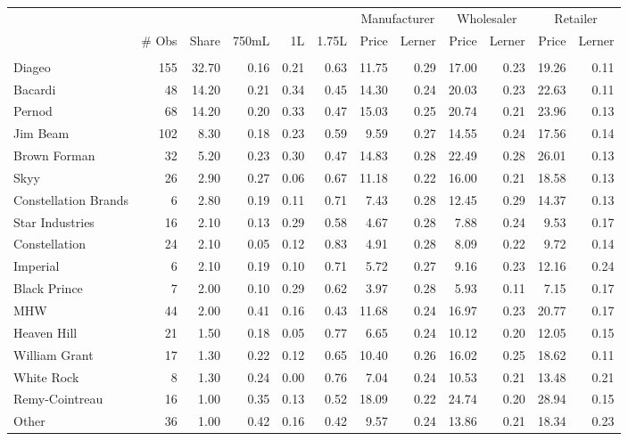 \begin{tabular}{lrrrrrrrrrrr}
\toprule
 & & & & & &  \multicolumn{2}{c}{ Manufacturer } & \multicolumn{2}{c}{ Wholesaler }& \multicolumn{2}{c}{ Retailer } \\ 
 & \# Obs & Share & 750mL & 1L & 1.75L & Price & Lerner & Price & Lerner & Price & Lerner \\
 &  &  &  &  &  &  &  &  &  &  &  \\
\midrule
Diageo & 155 & 32.70 & 0.16 & 0.21 & 0.63 & 11.75 & 0.29 & 17.00 & 0.23 & 19.26 & 0.11 \\
Bacardi & 48 & 14.20 & 0.21 & 0.34 & 0.45 & 14.30 & 0.24 & 20.03 & 0.23 & 22.63 & 0.11 \\
Pernod & 68 & 14.20 & 0.20 & 0.33 & 0.47 & 15.03 & 0.25 & 20.74 & 0.21 & 23.96 & 0.13 \\
Jim Beam & 102 & 8.30 & 0.18 & 0.23 & 0.59 & 9.59 & 0.27 & 14.55 & 0.24 & 17.56 & 0.14 \\
Brown Forman & 32 & 5.20 & 0.23 & 0.30 & 0.47 & 14.83 & 0.28 & 22.49 & 0.28 & 26.01 & 0.13 \\
Skyy & 26 & 2.90 & 0.27 & 0.06 & 0.67 & 11.18 & 0.22 & 16.00 & 0.21 & 18.58 & 0.13 \\
Constellation Brands & 6 & 2.80 & 0.19 & 0.11 & 0.71 & 7.43 & 0.28 & 12.45 & 0.29 & 14.37 & 0.13 \\
Star Industries & 16 & 2.10 & 0.13 & 0.29 & 0.58 & 4.67 & 0.28 & 7.88 & 0.24 & 9.53 & 0.17 \\
Constellation & 24 & 2.10 & 0.05 & 0.12 & 0.83 & 4.91 & 0.28 & 8.09 & 0.22 & 9.72 & 0.14 \\
Imperial & 6 & 2.10 & 0.19 & 0.10 & 0.71 & 5.72 & 0.27 & 9.16 & 0.23 & 12.16 & 0.24 \\
Black Prince & 7 & 2.00 & 0.10 & 0.29 & 0.62 & 3.97 & 0.28 & 5.93 & 0.11 & 7.15 & 0.17 \\
MHW & 44 & 2.00 & 0.41 & 0.16 & 0.43 & 11.68 & 0.24 & 16.97 & 0.23 & 20.77 & 0.17 \\
Heaven Hill & 21 & 1.50 & 0.18 & 0.05 & 0.77 & 6.65 & 0.24 & 10.12 & 0.20 & 12.05 & 0.15 \\
William Grant & 17 & 1.30 & 0.22 & 0.12 & 0.65 & 10.40 & 0.26 & 16.02 & 0.25 & 18.62 & 0.11 \\
White Rock & 8 & 1.30 & 0.24 & 0.00 & 0.76 & 7.04 & 0.24 & 10.53 & 0.21 & 13.48 & 0.21 \\
Remy-Cointreau & 16 & 1.00 & 0.35 & 0.13 & 0.52 & 18.09 & 0.22 & 24.74 & 0.20 & 28.94 & 0.15 \\
Other & 36 & 1.00 & 0.42 & 0.16 & 0.42 & 9.57 & 0.24 & 13.86 & 0.21 & 18.34 & 0.23 \\

\end{tabular}
